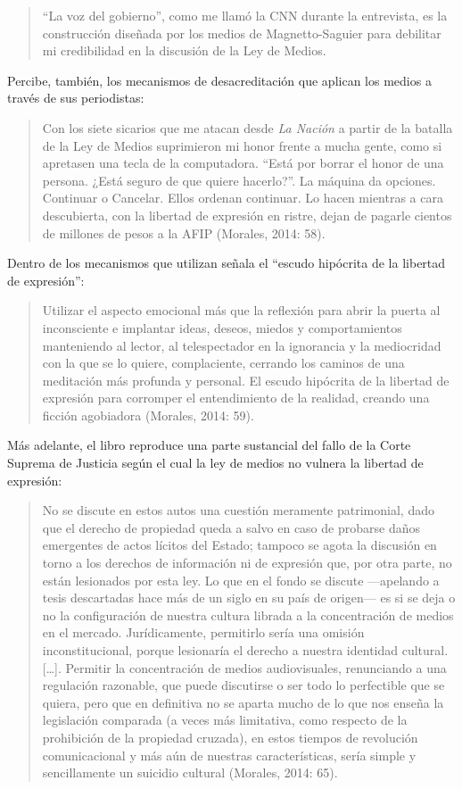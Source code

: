 {\begin{quote}
``La voz del gobierno'', como me llamó la CNN durante la entrevista, es la construcción diseñada por los medios de Magnetto-Saguier para debilitar mi credibilidad en la discusión de la Ley de Medios.
\end{quote}

Percibe, también, los mecanismos de desacreditación que aplican los medios a través de sus periodistas:

\begin{quote}
Con los siete sicarios que me atacan desde \emph{La Nación} a partir de la batalla de la Ley de Medios suprimieron mi honor frente a mucha gente, como si apretasen una tecla de la computadora. ``Está por borrar el honor de una persona. ¿Está seguro de que quiere hacerlo?''. La máquina da opciones. Continuar o Cancelar. Ellos ordenan continuar. Lo hacen mientras a cara descubierta, con la libertad de expresión en ristre, dejan de pagarle cientos de millones de pesos a la AFIP (Morales, 2014: 58).
\end{quote}

Dentro de los mecanismos que utilizan señala el ``escudo hipócrita de la libertad de expresión'':

\begin{quote}
Utilizar el aspecto emocional más que la reflexión para abrir la puerta al inconsciente e implantar ideas, deseos, miedos y comportamientos manteniendo al lector, al telespectador en la ignorancia y la mediocridad con la que se lo quiere, complaciente, cerrando los caminos de una meditación más profunda y personal. El escudo hipócrita de la libertad de expresión para corromper el entendimiento de la realidad, creando una ficción agobiadora (Morales, 2014: 59).
\end{quote}

Más adelante, el libro reproduce una parte sustancial del fallo de la Corte Suprema de Justicia según el cual la ley de medios no vulnera la libertad de expresión:

\begin{quote}
No se discute en estos autos una cuestión meramente patrimonial, dado que el derecho de propiedad queda a salvo en caso de probarse daños emergentes de actos lícitos del Estado; tampoco se agota la discusión en torno a los derechos de información ni de expresión que, por otra parte, no están lesionados por esta ley. Lo que en el fondo se discute ---apelando a tesis descartadas hace más de un siglo en su país de origen--- es si se deja o no la configuración de nuestra cultura librada a la concentración de medios en el mercado. Jurídicamente, permitirlo sería una omisión inconstitucional, porque lesionaría el derecho a nuestra identidad cultural.{[}\ldots{]}. Permitir la concentración de medios audiovisuales, renunciando a una regulación razonable, que puede discutirse o ser todo lo perfectible que se quiera, pero que en definitiva no se aparta mucho de lo que nos enseña la legislación comparada (a veces más limitativa, como respecto de la prohibición de la propiedad cruzada), en estos tiempos de revolución comunicacional y más aún de nuestras características, sería simple y sencillamente un suicidio cultural (Morales, 2014: 65).
\end{quote}

}
